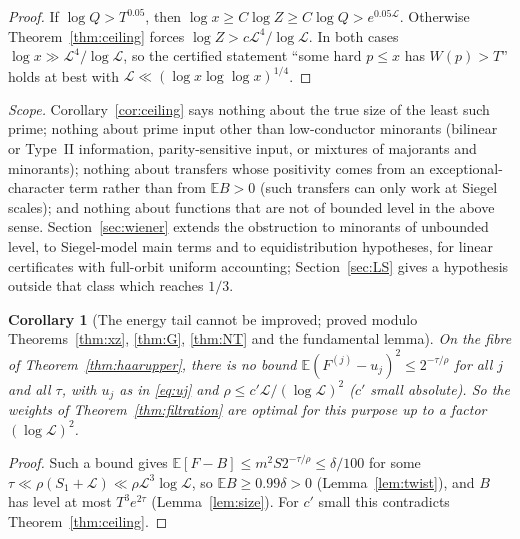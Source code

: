 \documentclass[11pt,reqno]{amsart}
\newtheorem{corollary}[theorem]{Corollary}
\theoremstyle{definition}
\newcommand{\Lc}{\mathcal L}
\newcommand{\E}{\mathbb E}
\begin{document}
\begin{proof}
If $\log Q>T^{0.05}$, then $\log x\ge C\log Z\ge C\log Q>e^{0.05\Lc}$.  Otherwise
Theorem~\ref{thm:ceiling} forces $\log Z>c\Lc^4/\log\Lc$.  In both cases
$\log x\gg\Lc^4/\log\Lc$, so the certified statement ``some hard $p\le x$ has
$W(p)>T$'' holds at best with $\Lc\ll(\log x\log\log x)^{1/4}$.
\end{proof}

\emph{Scope.}  Corollary~\ref{cor:ceiling} says nothing about the true size of
the least such prime; nothing about prime input other than low-conductor
minorants (bilinear or Type~II information, parity-sensitive input, or
mixtures of majorants and minorants); nothing about transfers whose
positivity comes from an exceptional-character term rather than from
$\E B>0$ (such transfers can only work at Siegel scales); and nothing about
functions that are not of bounded level in the above sense.  Section~\ref{sec:wiener}
extends the obstruction to minorants of unbounded level, to Siegel-model
main terms and to equidistribution hypotheses, for linear certificates with
full-orbit uniform accounting; Section~\ref{sec:LS} gives a hypothesis
outside that class which reaches $1/3$.

\begin{corollary}[The energy tail cannot be improved; proved modulo Theorems~\ref{thm:xz}, \ref{thm:G}, \ref{thm:NT} and the fundamental lemma]\label{cor:notail}
On the fibre of Theorem~\ref{thm:haarupper}, there is no bound
$\E(F^{(j)}-u_j)^2\le2^{-\tau/\rho}$ for all $j$ and all $\tau$, with $u_j$ as in
\eqref{eq:uj} and $\rho\le c'\Lc/(\log\Lc)^2$ ($c'$ small absolute).  So the
weights of Theorem~\ref{thm:filtration} are optimal for this purpose up to a
factor $(\log\Lc)^2$.
\end{corollary}

\begin{proof}
Such a bound gives $\E[F-B]\le m^2S2^{-\tau/\rho}\le\delta/100$ for some
$\tau\ll\rho(S_1+\Lc)\ll\rho\Lc^3\log\Lc$, so $\E B\ge0.99\delta>0$ (Lemma~\ref{lem:twist}),
and $B$ has level at most $T^3e^{2\tau}$ (Lemma~\ref{lem:size}).  For $c'$ small
this contradicts Theorem~\ref{thm:ceiling}.
\end{proof}
\end{document}
